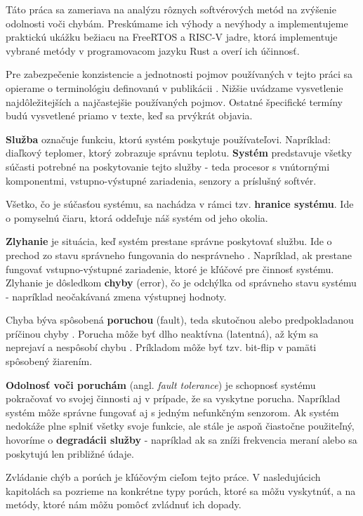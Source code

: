 \documentclass[12pt, letterpaper, slovak]{article}
\begin{document}
Táto práca sa zameriava na analýzu rôznych softvérových metód na zvýšenie odolnosti voči chybám. Preskúmame ich výhody a nevýhody a implementujeme praktickú ukážku bežiacu na FreeRTOS a RISC-V jadre, ktorá implementuje vybrané metódy v programovacom jazyku Rust a overí ich účinnosť.

Pre zabezpečenie konzistencie a jednotnosti pojmov používaných v tejto práci sa opierame o terminológiu definovanú v publikácii \cite{1335465}. Nižšie uvádzame vysvetlenie najdôležitejších a najčastejšie používaných pojmov. Ostatné špecifické termíny budú vysvetlené priamo v texte, keď sa prvýkrát objavia.

\textbf{Služba} označuje funkciu, ktorú systém poskytuje používateľovi. Napríklad: diaľkový teplomer, ktorý zobrazuje správnu teplotu. \textbf{Systém} predstavuje všetky súčasti potrebné na poskytovanie tejto služby - teda procesor s vnútornými komponentmi, vstupno-výstupné zariadenia, senzory a príslušný softvér.

Všetko, čo je súčasťou systému, sa nachádza v rámci tzv. \textbf{hranice systému}. Ide o pomyselnú čiaru, ktorá oddeľuje náš systém od jeho okolia.

\textbf{Zlyhanie} je situácia, keď systém prestane správne poskytovať službu. Ide o prechod zo stavu správneho fungovania do nesprávneho \cite{1335465}. Napríklad, ak prestane fungovať vstupno-výstupné zariadenie, ktoré je kľúčové pre činnosť systému. Zlyhanie je dôsledkom \textbf{chyby} (error), čo je odchýlka od správneho stavu systému - napríklad neočakávaná zmena výstupnej hodnoty.

Chyba býva spôsobená \textbf{poruchou} (fault), teda skutočnou alebo predpokladanou príčinou chyby \cite{shubu}. Porucha môže byť dlho neaktívna (latentná), až kým sa neprejaví a nespôsobí chybu \cite{1335465}. Príkladom môže byť tzv. bit-flip v pamäti spôsobený žiarením.

\textbf{Odolnosť voči poruchám} (angl. \textit{fault tolerance}) je schopnosť systému pokračovať vo svojej činnosti aj v prípade, že sa vyskytne porucha. Napríklad systém môže správne fungovať aj s jedným nefunkčným senzorom. Ak systém nedokáže plne splniť všetky svoje funkcie, ale stále je aspoň čiastočne použiteľný, hovoríme o \textbf{degradácii služby} - napríklad ak sa zníži frekvencia meraní alebo sa poskytujú len približné údaje.

Zvládanie chýb a porúch je kľúčovým cieľom tejto práce. V nasledujúcich kapitolách sa pozrieme na konkrétne typy porúch, ktoré sa môžu vyskytnúť, a na metódy, ktoré nám môžu pomôcť zvládnuť ich dopady.
\end{document}
